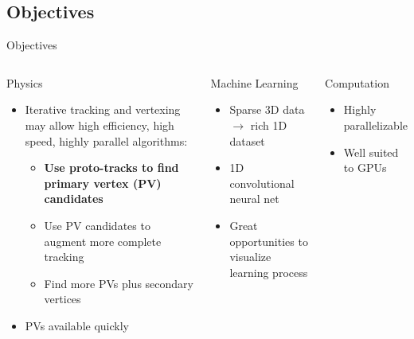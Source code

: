 \subsection{Objectives}
\begin{frame}{Objectives}
\begin{columns}[c]
    \begin{block}{Physics}
    \begin{itemize}
        \item Iterative tracking and vertexing may allow high efficiency, high speed, highly parallel algorithms:
        \begin{itemize}
            \item {\bf Use proto-tracks to find primary vertex (PV) candidates}
            \item Use PV candidates to augment more complete tracking
            \item Find more PVs plus secondary vertices
        \end{itemize}
        \item PVs available quickly
    \end{itemize}
    \end{block}
    \begin{block}{Machine Learning}
    \begin{itemize}
        \item Sparse 3D data $\to$ rich 1D dataset
        \item 1D convolutional neural net
        \item Great opportunities to visualize learning process
    \end{itemize}
    \end{block}
    
    \begin{block}{Computation}
    \begin{itemize}
        \item Highly parallelizable
        \item Well suited to GPUs
    \end{itemize}
    \end{block}
\end{columns}


\end{frame}

